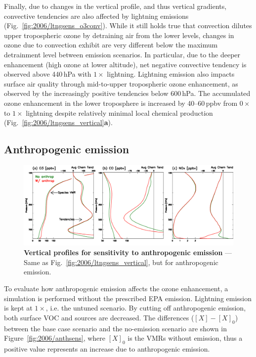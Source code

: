 Finally, due to changes in the vertical profile, and thus vertical gradients, convective tendencies are also affected by
lightning emissions (Fig.~\ref{fig:2006/ltngsens_o3conv}). While it still holds true that convection dilutes upper
tropospheric ozone by detraining air from the lower levels, changes in ozone due to convection exhibit are very different
below the maximum detrainment level between emission scenarios. In particular, due to the deeper enhancement (high
ozone at lower altitude), net negative convective tendency is observed above 440\,\unit{hPa} with $1\times$ lightning.
Lightning emission also impacts surface air quality through mid-to-upper tropospheric ozone enhancement, as observed
by the increasingly positive tendencies below 600\,\unit{hPa}. The accumulated ozone enhancement in the lower
troposphere is increased by 40--60\,\unit{ppbv} from $0\times$ to $1\times$ lightning despite relatively minimal local
chemical production (Fig.~\ref{fig:2006/ltngsens_vertical}{\bf a}).

\subsection{Anthropogenic emission}\label{ssec:2006/sens/anthrop}

	\begin{figure}[t!]
		\centering
		\includegraphics[width=1.0\textwidth]{sens/anthsens_vert}
		\caption[Vertical profiles for sensitivity to anthropogenic emission]{\textbf{Vertical profiles for sensitivity to
		anthropogenic emission} --- Same as Fig.~\ref{fig:2006/ltngsens_vertical}, but for anthropogenic emission.
		\label{fig:2006/anthsens_vert} }\vspace{-.3in}
	\end{figure}

To evaluate how anthropogenic emission affects the ozone enhancement, a simulation is performed without the prescribed
EPA emission. Lightning emission is kept at $1\times$, i.e. the untuned scenario. By cutting off anthropogenic emission, both
surface VOC and  sources are decreased. The differences ($[X]-[X]_0$) between the base case scenario and
the no-emission scenario are shown in Figure~\ref{fig:2006/anthsens}, where $[X]_0$ is the VMRs without emission, thus
a positive value represents an increase due to anthropogenic emission.

